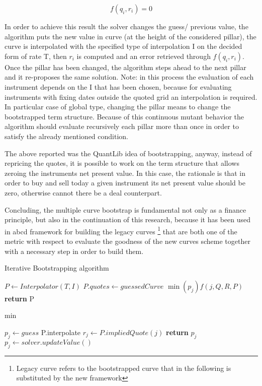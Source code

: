 \begin{equation*}
   f(q_{i},r_{i})=0
\end{equation*}

In order to achieve this result the solver changes the guess/ previous value, the algorithm puts the new value in curve (at the height of the considered pillar), the curve is interpolated with the specified type of interpolation I on the decided form of rate T, then $r_{i}$ is computed and an error retrieved through $f(q_{i},r_{i})$.
Once the pillar has been changed, the algorithm steps ahead to the next pillar and it re-proposes the same solution.
Note: in this process the evaluation of each instrument depends on the I that has been chosen, because for evaluating instruments with fixing dates outside the quoted grid an interpolation is required. In particular case of global type, changing the pillar means to change the bootstrapped term structure. Because of this continuous mutant behavior the algorithm should evaluate recursively each pillar more than once in order to satisfy the already mentioned condition. 

The above reported was the QuantLib idea of bootstrapping, anyway, instead of repricing the quotes, it is possible to work on the term structure that allows zeroing the instruments net present value. In this case, the rationale is that in order to buy and sell today a given instrument its net present value should be zero, otherwise cannot there be a deal counterpart.

Concluding, the multiple curve bootstrap is fundamental not only as a finance principle, but also in the continuation of this research, because it has been used in abcd framework for building the legacy curves \footnote{Legacy curve refers to the bootstrapped curve that in the following is substituted by the new framework} that are both one of the metric with respect to evaluate the goodness of the new curves scheme together with a necessary step in order to build them.

\begin{algorithm}
	\caption{Iterative Bootstrapping algorithm}
	\label{alg:bootstrapping}
	\begin{algorithmic}[1]
	    \State $P\gets Interpolator(T,I)$
	    \State $P.quotes \gets guessedCurve$
	    \State $\min (p_{j}) f(j,Q,R,P)$
		\EndFor
		\State \textbf{return} P 
		\EndIf
		\EndFor
	\EndProcedure
	\end{algorithmic}
\end{algorithm}

\begin{algorithm}
	\caption{min}{}
	\label{alg:min}
	\begin{algorithmic}[1]
	   \State $p_{j} \gets guess$
	   \EndIf
	   \State P.interpolate
	   \State $r_{j}\gets P.impliedQuote(j)$
	   \State \textbf{return} $p_{j}$
	   \EndIf
	   \State $p_{j} \gets solver.updateValue()$
	   \EndFor
	\EndProcedure
	\end{algorithmic}
\end{algorithm}